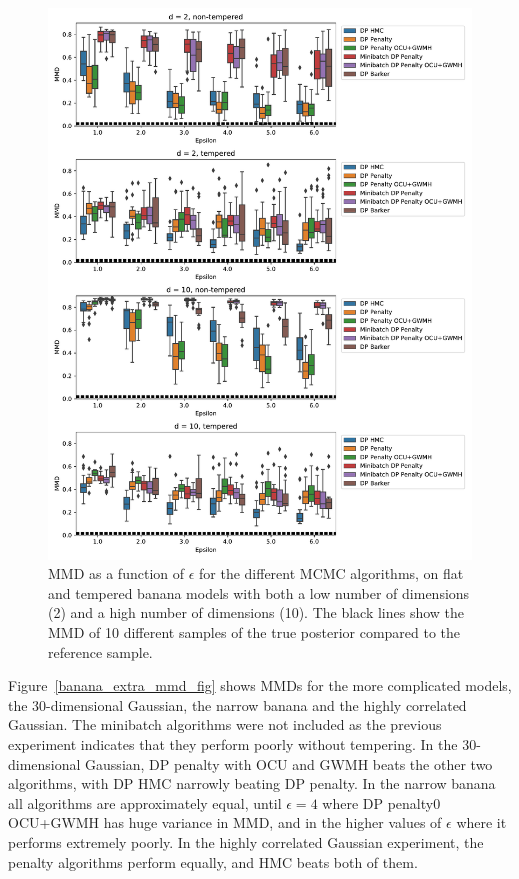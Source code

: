 \documentclass[english,twoside,openright]{HYgraduMLDS}
\begin{document}
\begin{figure}
  \centering
  \includegraphics[width=\textwidth]{figures/banana_mmd.pdf}
  \caption{
    MMD as a function of \(\epsilon\) for the different MCMC algorithms,
    on flat and tempered banana models with both a low number of dimensions (2)
    and a high number of dimensions (10). The black lines show the MMD of 10
    different samples of the true posterior compared to the reference sample.
  }
  \label{banana_mmd_fig}

\end{figure}

Figure~\ref{banana_extra_mmd_fig} shows MMDs for the more complicated models,
the 30-dimensional Gaussian, the narrow banana and the highly correlated Gaussian.
The minibatch algorithms were not included as the previous experiment indicates
that they perform poorly without tempering.
In the 30-dimensional Gaussian, DP penalty with OCU and GWMH beats the other
two algorithms, with DP HMC narrowly beating DP penalty. In the narrow
banana all algorithms are approximately equal, until \(\epsilon = 4\) where
DP penalty0 OCU+GWMH has huge variance in MMD, and in the higher values of
\(\epsilon\) where it performs extremely poorly. In the highly correlated
Gaussian experiment, the penalty algorithms perform equally, and HMC beats
both of them.
\end{document}
